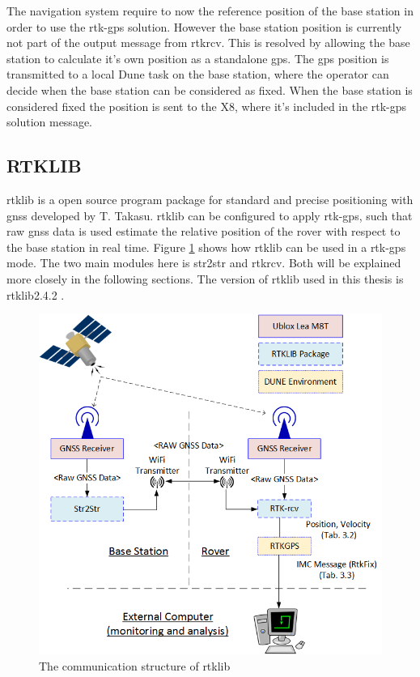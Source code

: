 The navigation system require to now the reference position of the base station in order to use the \gls{rtk-gps} solution. However the base station position is currently not part of the output message from rtkrcv. This is resolved by allowing the base station to calculate it's own position as a standalone \gls{gps}. The \gls{gps} position is transmitted to a local Dune task on the base station, where the operator can decide when the base station can be considered as fixed. When the base station is considered fixed the position is sent to the X8, where it's included in the \gls{rtk-gps} solution message.
\subsection{RTKLIB}\label{ss:Rtklib}
\acrfull{rtklib}\citep{takasu2009development} is a open source program package for standard and precise positioning with \gls{gnss} developed by T. Takasu. \gls{rtklib} can be configured to apply \gls{rtk-gps}, such that raw \gls{gnss} data is used estimate the relative position of the rover with respect to the base station in real time. Figure \ref{figure:RTKLIB_STRUCTURE} shows how \gls{rtklib} can be used in a \gls{rtk-gps} mode. The two main modules here is str2str and rtkrcv. Both will be explained more closely in the following sections. The version of \gls{rtklib} used in this thesis is \gls{rtklib}2.4.2 \citep{Rtklib242}.
\begin{figure}[H]
	\centering
		\includegraphics[width=1\textwidth]{figs/RTKLIB.png}
		\caption{The communication structure of \gls{rtklib}}
		\label{figure:RTKLIB_STRUCTURE}
\end{figure}
